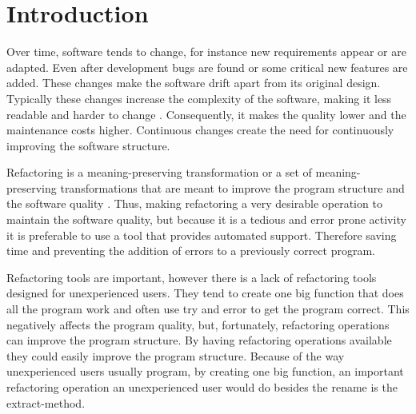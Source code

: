 
% 
% 

\section{Introduction}


Over time, software tends to change, for instance new requirements appear or are adapted. 
Even after development bugs are found or some critical new features are added.
These changes make the software drift apart from its original design.
Typically these changes increase the complexity of the software, making it less readable and harder to change \cite{mens2003refactoring}. 
Consequently, it makes the quality lower and the maintenance costs higher.
Continuous changes create the need for continuously improving the software structure.

Refactoring is a meaning-preserving transformation or a set of meaning-preserving transformations that are meant to improve the program structure and the software quality \cite{bourquin2007high}.
Thus, making refactoring a very desirable operation to maintain the software quality, but because it is a tedious and error prone activity it is preferable to use a tool that provides automated support. 
Therefore saving time and preventing the addition of errors to a previously correct program.

%
Refactoring tools are important, however there is a lack of refactoring tools designed for unexperienced users.
They tend to create one big function that does all the program work and often use try and error to get the program correct.
This negatively affects the program quality, but, fortunately, refactoring operations can improve the program structure.
By having refactoring operations available they could easily improve the program structure.
Because of the way unexperienced users usually program, by creating one big function, an important refactoring operation an unexperienced user would do besides the rename is the extract-method.

